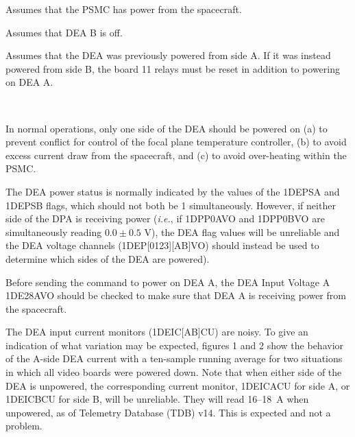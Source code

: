 \documentclass[11pt]{article}
\begin{document}
\vspace{0.15in}
\normalsize
{}
\normalsize
\be
\item Assumes that the PSMC has power from the spacecraft.
\vspace{-0.10in}
\item Assumes that DEA B is off.
\vspace{-0.10in}
\item Assumes that the DEA was previously powered from side A. If it was instead powered from side B, the board 11 relays must be reset in addition to powering on DEA A.
\ee
\vspace{0.1in}
\normalsize
{} \\
\normalsize

\normalsize
{} \\
\normalsize

In normal operations, only one side of the DEA should be powered on
(a) to prevent conflict for control of the focal plane temperature controller,
(b) to avoid excess current draw from the spacecraft, and (c) to avoid over-heating
within the PSMC.

The DEA power status is normally indicated by the values of the 1DEPSA and
1DEPSB flags, which should not both be 1 simultaneously.
However, if neither side of the DPA is receiving power
({\it i.e.}, if 1DPP0AVO and 1DPP0BVO are simultaneously reading $0.0 \pm 0.5$ V),
the DEA flag values will be unreliable and the DEA voltage
channels (1DEP[0123][AB]VO) should instead be used to determine which
sides of the DEA are powered).

Before sending the command to power on DEA A, the DEA Input Voltage A 1DE28AVO should
be checked to make sure that DEA A is receiving power from the spacecraft.

The DEA input current monitors (1DEIC[AB]CU) are noisy.
To give an indication of what variation may be expected, figures 1 and 2
show the behavior of the A-side DEA current with a ten-sample running
average for two situations in which all video boards were powered down. Note that
when either side of the DEA is unpowered, the corresponding current monitor, 
1DEICACU for side A, or 1DEICBCU for side B, will be unreliable. They will read
16--18~A when unpowered, as of Telemetry Database (TDB) v14. This is expected and
not a problem.
\end{document}
